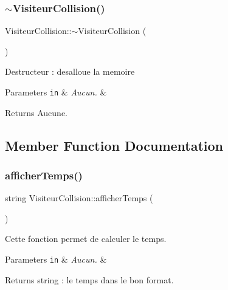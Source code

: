\subsubsection{\texorpdfstring{$\sim$\+Visiteur\+Collision()}{~VisiteurCollision()}}
{\footnotesize\ttfamily Visiteur\+Collision\+::$\sim$\+Visiteur\+Collision (\begin{DoxyParamCaption}{ }\end{DoxyParamCaption})}

Destructeur \+: desalloue la memoire


\begin{DoxyParams}[1]{Parameters}
\mbox{\tt in}  & {\em Aucun.} & \\
\hline
\end{DoxyParams}
\begin{DoxyReturn}{Returns}
Aucune. 
\end{DoxyReturn}


\subsection{Member Function Documentation}
\hypertarget{class_visiteur_collision_ae73a54932abf5972890c4b7c3ccf47ae}{}\label{class_visiteur_collision_ae73a54932abf5972890c4b7c3ccf47ae} 
\subsubsection{\texorpdfstring{afficher\+Temps()}{afficherTemps()}}
{\footnotesize\ttfamily string Visiteur\+Collision\+::afficher\+Temps (\begin{DoxyParamCaption}{ }\end{DoxyParamCaption})}

Cette fonction permet de calculer le temps.


\begin{DoxyParams}[1]{Parameters}
\mbox{\tt in}  & {\em Aucun.} & \\
\hline
\end{DoxyParams}
\begin{DoxyReturn}{Returns}
string \+: le temps dans le bon format. 
\end{DoxyReturn}
\hypertarget{class_visiteur_collision_a6bfba4fbee3a89120e5f78bdcccf535d}{}\label{class_visiteur_collision_a6bfba4fbee3a89120e5f78bdcccf535d} 

